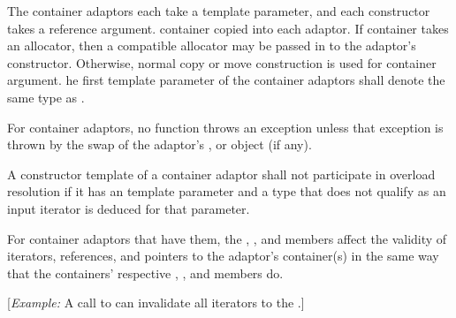 \pnum
The container adaptors each take a  template parameter, and
each constructor takes a  reference argument.  container copied into
each adaptor. If  container takes an allocator, then a compatible allocator may be passed in
to the adaptor's constructor. Otherwise, normal copy or move construction is
used for container argument.  he first template
parameter  of the container adaptors shall denote the same type
as .

\pnum
For container adaptors, no  function throws an exception unless
that exception is thrown by the swap of the
adaptor's , or
 object (if any).

\pnum
A constructor template of a container adaptor
shall not participate in overload resolution
if it has an  template parameter and
a type that does not qualify as an input iterator is deduced for that parameter.

\begin{addedblock}
\pnum
For container adaptors that have them, the , ,
and  members affect the validity of iterators, references, and
pointers to the adaptor's container(s) in the same way that the containers'
respective , , and  members do.

[\textit{Example:} A call to  can invalidate all iterators to
the .]
\end{addedblock}

